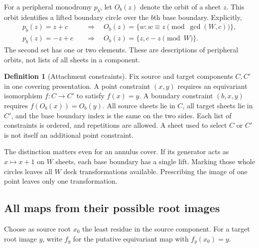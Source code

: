 \documentclass[11pt]{article}
\theoremstyle{definition}
\newtheorem{definition}[theorem]{Definition}
\theoremstyle{remark}
\begin{document}
For a peripheral monodromy $p_b$, let $O_b(z)$ denote the orbit of a sheet
$z$.  This orbit identifies a lifted boundary circle over the $b$th base
boundary.  Explicitly,
\begin{align}
 p_b(z)=z+c &\quad\Longrightarrow\quad
 O_b(z)=\{w:w\equiv z\pmod{\gcd(W,c)}\},\label{eq:bt-translation-orbit}\\
 p_b(z)=-z+c &\quad\Longrightarrow\quad
 O_b(z)=\{z,c-z\pmod W\}.\label{eq:bt-reflection-orbit}
\end{align}
The second set has one or two elements.  These are descriptions of
peripheral orbits, not lists of all sheets in a component.

\begin{definition}[Attachment constraints]
Fix source and target components $C,C'$ in one covering presentation.
A point constraint $(x,y)$ requires an equivariant isomorphism $f:C\to C'$
to satisfy $f(x)=y$.  A boundary constraint $(b,x,y)$ requires
$f(O_b(x))=O_b(y)$.  All source sheets lie in $C$, all target sheets lie in
$C'$, and the base boundary index is the same on the two sides.  Each
list of constraints is ordered, and repetitions are allowed.  A sheet
used to select $C$ or $C'$ is not itself an additional point constraint.
\end{definition}

The distinction matters even for an annulus cover.  If its generator acts
as $x\mapsto x+1$ on $W$ sheets, each base boundary has a single lift.
Marking those whole circles leaves all $W$ deck transformations available.
Prescribing the image of one point leaves only one transformation.

\subsection{All maps from their possible root images}

Choose as source root $x_0$ the least residue in the source component.
For a target root image $y$, write $f_y$ for the putative equivariant map
with $f_y(x_0)=y$.
\end{document}
